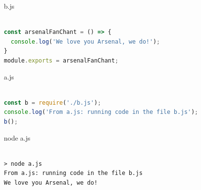 
\begin{frame}[fragile]{}

\begin{Code}{b.js}%
\begin{lstlisting}[language=javascript, firstnumber=1, label=glabels, xleftmargin=0pt, basicstyle=\scriptsize]% 

const arsenalFanChant = () => {
  console.log('We love you Arsenal, we do!');
}
module.exports = arsenalFanChant;
\end{lstlisting}%
\end{Code}%

\end{frame}

\begin{frame}[fragile]{}

\begin{Code}{a.js}%
\begin{lstlisting}[language=javascript, firstnumber=1, label=glabels, xleftmargin=0pt, basicstyle=\scriptsize]% 

const b = require('./b.js');
console.log('From a.js: running code in the file b.js'); 
b();
\end{lstlisting}%
\end{Code}%

\begin{Command}{node a.js}%
\begin{lstlisting}[firstnumber=1, label=glabels, xleftmargin=0pt, basicstyle=\scriptsize]% 

> node a.js
From a.js: running code in the file b.js
We love you Arsenal, we do!
\end{lstlisting}%
\end{Command}%

\end{frame}